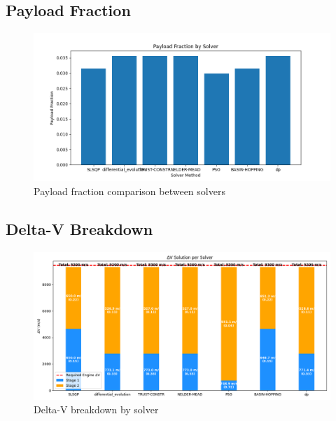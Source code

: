 \documentclass{article}
\begin{document}
\subsection{Payload Fraction}
\begin{figure}[H]
\centering
\includegraphics[width=\textwidth]{payload_fraction.png}
\caption{Payload fraction comparison between solvers}
\end{figure}
\subsection{Delta-V Breakdown}
\begin{figure}[H]
\centering
\includegraphics[width=\textwidth]{dv_breakdown.png}
\caption{Delta-V breakdown by solver}
\end{figure}
\end{document}
